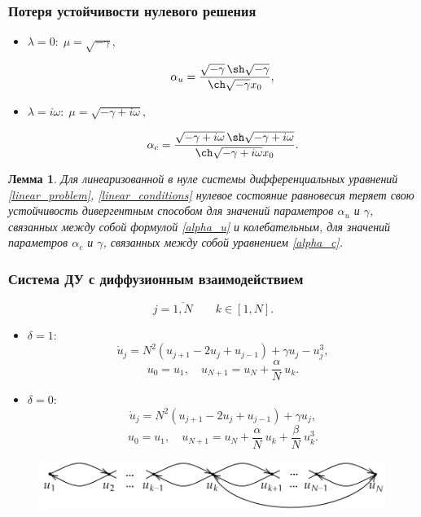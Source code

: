 \documentclass[fullscreen=true, unicode, bookmarks=false]{beamer}
\newtheorem{ruslemma}{Лемма }
\begin{document}
\begin{frame}
\frametitle{ Потеря устойчивости нулевого решения }

\begin{itemize}

\item { $ \lambda = 0: \; \mu = \sqrt{-\gamma}, $ 
}

\begin{equation}\label{alpha_u}
	\alpha_u = \dfrac{ \sqrt{-\gamma} \, \sh \sqrt{-\gamma} }{ \ch \sqrt{-\gamma} x_0 }, 
\end{equation}

\item { $ \lambda = i \omega: \; \mu = \sqrt{-\gamma + i \omega}, $ 
}

\begin{equation}\label{alpha_c}
	\alpha_c = \frac{ \sqrt{-\gamma + i \omega} \, \sh \sqrt{-\gamma + i \omega} }{ \ch \sqrt{-\gamma + i \omega} x_0 }.
\end{equation}

\end{itemize}	

\begin{ruslemma}
Для линеаризованной в нуле системы дифференциальных уравнений \eqref{linear_problem}, \eqref{linear_conditions} нулевое состояние равновесия теряет свою устойчивость дивергентным способом для значений параметров $\alpha_u$ и $\gamma$, связанных между собой формулой \eqref{alpha_u} и колебательным, для значений параметров $\alpha_c$ и $\gamma$, связанных между собой уравнением \eqref{alpha_c}.
\end{ruslemma}

\end{frame}

\begin{frame}
\frametitle{Система ДУ с диффузионным взаимодействием}

$$ j = \overline{1, N} \qquad k \in [1,N]. $$

\begin{itemize}

\item $ \delta = 1: $
$$
\dot{u}_j =  N^2(u_{j+1} - 2u_j + u_{j-1}) + \gamma u_j - u_j^3,	
$$
$$ u_0 = u_1, \quad u_{N+1} = u_N + \frac{\alpha}{N}\:u_k. $$

\vfill

\item $ \delta = 0: $
$$
\dot{u}_j =  N^2(u_{j+1} - 2u_j + u_{j-1}) + \gamma u_j,	
$$
$$ u_0 = u_1, \quad u_{N+1} = u_N + \frac{\alpha}{N}\:u_k + \frac{\beta}{N}\:u_k^3. $$

\end{itemize}

\vfill

\begin{figure} 
\includegraphics[scale=0.4]{chain.png}  
\end{figure}

\end{frame}
\end{document}

